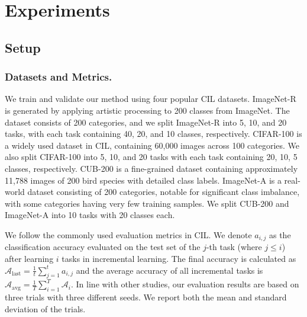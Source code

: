 \section{Experiments}
\subsection{Setup}

\subsubsection{Datasets and Metrics.}
We train and validate our method using four popular CIL datasets. ImageNet-R \cite{hendrycks2021many} is generated by applying artistic processing to 200 classes from ImageNet. The dataset consists of 200 categories, and we split ImageNet-R into 5, 10, and 20 tasks, with each task containing 40, 20, and 10 classes, respectively. CIFAR-100 \cite{Krizhevsky2009LearningML} is a widely used dataset in CIL, containing 60,000 images across 100 categories. We also split CIFAR-100 into 5, 10, and 20 tasks with each task containing 20, 10, 5 classes, respectively. CUB-200 \cite{WahCUB_200_2011} is a fine-grained dataset containing approximately 11,788 images of 200 bird species with detailed class labels. ImageNet-A \cite{hendrycks2021natural}is a real-world dataset consisting of 200 categories, notable for significant class imbalance, with some categories having very few training samples. We split CUB-200 and ImageNet-A into 10 tasks with 20 classes each. 


We follow the commonly used evaluation metrics in CIL. We denote $a_{i,j}$ as the classification accuracy evaluated on the test set of the $j$-th task (where $j \leq i$) after learning $i$ tasks in incremental learning. The final accuracy is calculated as $\mathcal{A}_{\text{last}} = \frac{1}{t}\sum_{j=1}^t a_{i,j}$
and the average accuracy of all incremental tasks is $\mathcal{A}_{\text{avg}} = \frac{1}{T}\sum_{i=1}^T \mathcal{A}_i$. In line with other studies, our evaluation results are based on three trials with three different seeds. We report both the mean and standard deviation of the trials.

